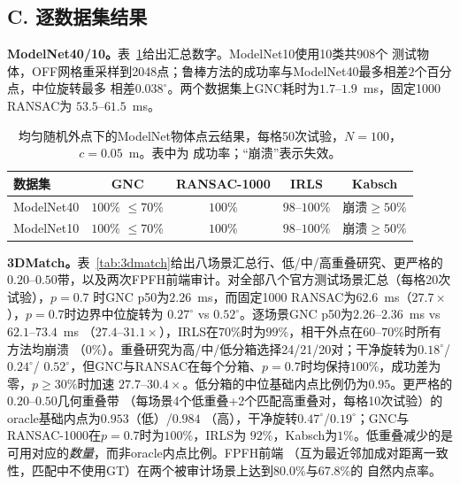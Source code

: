 \subsection*{C. 逐数据集结果}
\label{app:datasets}

\noindent\textbf{ModelNet40/10。}表~\ref{tab:modelnet}给出汇总数字。ModelNet10使用10类共908个
测试物体，OFF网格重采样到2048点；鲁棒方法的成功率与ModelNet40最多相差$2$个百分点，中位旋转最多
相差$0.038^\circ$。两个数据集上GNC耗时为$1.7$--$1.9$~ms，固定1000 RANSAC为
$53.5$--$61.5$~ms。

\begin{table}[t]
\caption{均匀随机外点下的ModelNet物体点云结果，每格50次试验，$N=100$，$c=0.05$~m。表中为
成功率；“崩溃”表示失效。}
\label{tab:modelnet}
\centering
\scriptsize
\setlength{\tabcolsep}{2.5pt}
\begin{tabular}{lcccc}
\toprule
数据集 & GNC & RANSAC-1000 & IRLS & Kabsch \\
\midrule
ModelNet40 & $100\%$ $\le70\%$ & $100\%$ & $98$--$100\%$ & 崩溃$\ge50\%$ \\
ModelNet10 & $100\%$ $\le70\%$ & $100\%$ & $98$--$100\%$ & 崩溃$\ge50\%$ \\
\bottomrule
\end{tabular}
\end{table}

\noindent\textbf{3DMatch。}表~\ref{tab:3dmatch}给出八场景汇总行、低/中/高重叠研究、更严格的
$0.20$--$0.50$带，以及两次FPFH前端审计。对全部八个官方测试场景汇总（每格20次试验），$p=0.7$
时GNC p50为$2.26$~ms，而固定1000 RANSAC为$62.6$~ms（$27.7\times$），$p=0.7$时边界中位旋转为
$0.27^\circ$ vs $0.52^\circ$。逐场景GNC p50为$2.26$--$2.36$~ms vs $62.1$--$73.4$~ms
（$27.4$--$31.1\times$），IRLS在$70\%$时为$99\%$，相干外点在$60$--$70\%$时所有方法均崩溃
（$0\%$）。重叠研究为高/中/低分箱选择24/21/20对；干净旋转为$0.18^\circ$/$0.24^\circ$/
$0.52^\circ$，但GNC与RANSAC在每个分箱、$p=0.7$时均保持$100\%$，成功差为零，$p\ge30\%$时加速
$27.7$--$30.4\times$。低分箱的中位基础内点比例仍为$0.95$。更严格的$0.20$--$0.50$几何重叠带
（每场景4个低重叠+2个匹配高重叠对，每格10次试验）的oracle基础内点为$0.953$（低）/$0.984$
（高），干净旋转$0.47^\circ$/$0.19^\circ$；GNC与RANSAC-1000在$p=0.7$时为$100\%$，IRLS为
$92\%$，Kabsch为$1\%$。低重叠减少的是可用对应的\emph{数量}，而非oracle内点比例。FPFH前端
（互为最近邻加成对距离一致性，匹配中不使用GT）在两个被审计场景上达到$80.0\%$与$67.8\%$的
自然内点率。

